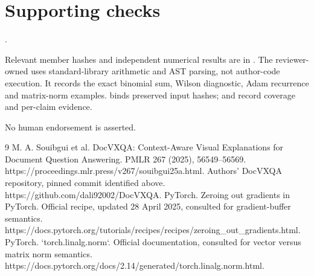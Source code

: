 \documentclass[10pt]{article}
\begin{document}
\section*{Supporting checks}
.\par
Relevant member hashes and independent numerical results are in . The reviewer-owned uses standard-library arithmetic and AST parsing, not author-code execution. It records the exact binomial sum, Wilson diagnostic, Adam recurrence and matrix-norm examples. binds preserved input hashes; and record coverage and per-claim evidence.\par
No human endorsement is asserted.\par
9 M. A. Souibgui et al. DocVXQA: Context-Aware Visual Explanations for Document Question Answering. PMLR 267 (2025), 56549–56569. https://proceedings.mlr.press/v267/souibgui25a.html. Authors’ DocVXQA repository, pinned commit identified above. https://github.com/dali92002/DocVXQA. PyTorch. Zeroing out gradients in PyTorch. Official recipe, updated 28 April 2025, consulted for gradient-buffer semantics. https://docs.pytorch.org/tutorials/recipes/recipes/zeroing\_out\_gradients.html. PyTorch. `torch.linalg.norm`. Official documentation, consulted for vector versus matrix norm semantics. https://docs.pytorch.org/docs/2.14/generated/torch.linalg.norm.html.\par
\end{document}
